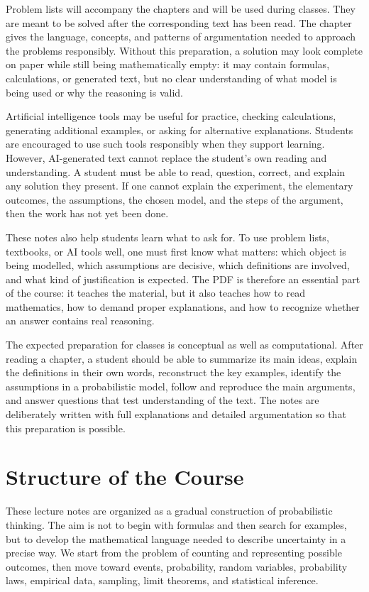 Problem lists will accompany the chapters and will be used during classes. They are meant to be solved after the corresponding text has been read. The chapter gives the language, concepts, and patterns of argumentation needed to approach the problems responsibly. Without this preparation, a solution may look complete on paper while still being mathematically empty: it may contain formulas, calculations, or generated text, but no clear understanding of what model is being used or why the reasoning is valid.

Artificial intelligence tools may be useful for practice, checking calculations, generating additional examples, or asking for alternative explanations. Students are encouraged to use such tools responsibly when they support learning. However, AI-generated text cannot replace the student's own reading and understanding. A student must be able to read, question, correct, and explain any solution they present. If one cannot explain the experiment, the elementary outcomes, the assumptions, the chosen model, and the steps of the argument, then the work has not yet been done.

These notes also help students learn what to ask for. To use problem lists, textbooks, or AI tools well, one must first know what matters: which object is being modelled, which assumptions are decisive, which definitions are involved, and what kind of justification is expected. The PDF is therefore an essential part of the course: it teaches the material, but it also teaches how to read mathematics, how to demand proper explanations, and how to recognize whether an answer contains real reasoning.

The expected preparation for classes is conceptual as well as computational. After reading a chapter, a student should be able to summarize its main ideas, explain the definitions in their own words, reconstruct the key examples, identify the assumptions in a probabilistic model, follow and reproduce the main arguments, and answer questions that test understanding of the text. The notes are deliberately written with full explanations and detailed argumentation so that this preparation is possible.

\section{Structure of the Course}

These lecture notes are organized as a gradual construction of probabilistic thinking. The aim is not to begin with formulas and then search for examples, but to develop the mathematical language needed to describe uncertainty in a precise way. We start from the problem of counting and representing possible outcomes, then move toward events, probability, random variables, probability laws, empirical data, sampling, limit theorems, and statistical inference.

